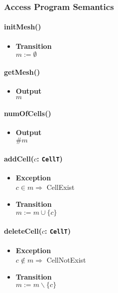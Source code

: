 \documentclass[12pt,titlepage]{article}
\begin{document}
\subsubsection{Access Program Semantics} 
\paragraph{initMesh()}
\begin{itemize}
\item \textbf{Transition}\\ 
$ m := \emptyset$
\end{itemize}

\paragraph{getMesh()}
\begin{itemize}
\item \textbf{Output}\\ $m$ 
\end{itemize}

\paragraph{numOfCells()}
\begin{itemize}
\item \textbf{Output} \\
$\# m$
\end{itemize}

\paragraph{addCell($c$: {\tt CellT})}
\begin{itemize}
\item \textbf{Exception}\\
$c \in m \Longrightarrow$ CellExist
\item \textbf{Transition} \\
$m := m \cup \{c\}$
\end{itemize}

\paragraph{deleteCell($c$: {\tt CellT})}
\begin{itemize}
\item \textbf{Exception}\\
$c \notin m \Longrightarrow$ CellNotExist
\item \textbf{Transition} \\
$m := m \backslash \{c\}$
\end{itemize}
\end{document}
